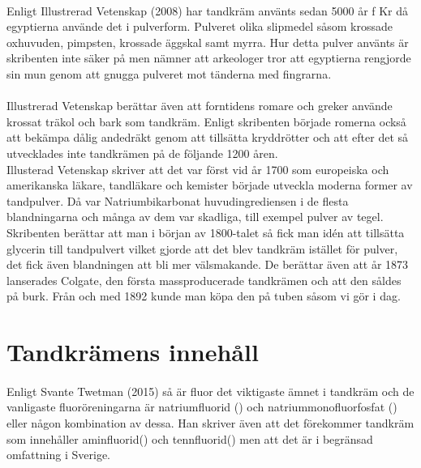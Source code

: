 \documentclass[12pt]{article}
\begin{document}
				\paragraph{}Enligt Illustrerad Vetenskap (2008) har tandkräm använts sedan 5000 år f Kr då egyptierna använde det i pulverform. Pulveret olika slipmedel såsom krossade oxhuvuden, pimpsten, krossade äggskal samt myrra. Hur detta pulver använts är skribenten inte säker på men nämner att arkeologer tror att egyptierna rengjorde sin mun genom att gnugga pulveret mot tänderna med fingrarna.\\
			
			\paragraph{}Illustrerad Vetenskap berättar även att forntidens romare och greker använde krossat träkol och bark som tandkräm. Enligt skribenten började romerna också att bekämpa dålig andedräkt genom att tillsätta kryddrötter och att efter det så utvecklades inte tandkrämen på de följande 1200 åren. \\
			
			Illusterad Vetenskap skriver att det var först vid år 1700 som europeiska och amerikanska läkare, tandläkare och kemister började utveckla moderna former av tandpulver. Då var Natriumbikarbonat huvudingrediensen i de flesta blandningarna och många av dem var skadliga, till exempel pulver av tegel. \\
			
			Skribenten berättar att man i början av 1800-talet så fick man idén att tillsätta glycerin till tandpulvert vilket gjorde att det blev tandkräm istället för pulver, det fick även blandningen att bli mer välsmakande. De berättar även att år 1873 lanserades Colgate, den första massproducerade tandkrämen och att den såldes på burk. Från och med 1892 kunde man köpa den på tuben såsom vi gör i dag.
	
	\section{Tandkrämens innehåll}
		\paragraph{}Enligt Svante Twetman (2015) så är fluor det viktigaste ämnet i tandkräm och de vanligaste fluoröreningarna är natriumfluorid () och natriummonofluorfosfat () eller någon kombination av dessa. Han skriver även att det förekommer tandkräm som innehåller aminfluorid() och tennfluorid() men att det är i begränsad omfattning i Sverige. 
\end{document}
